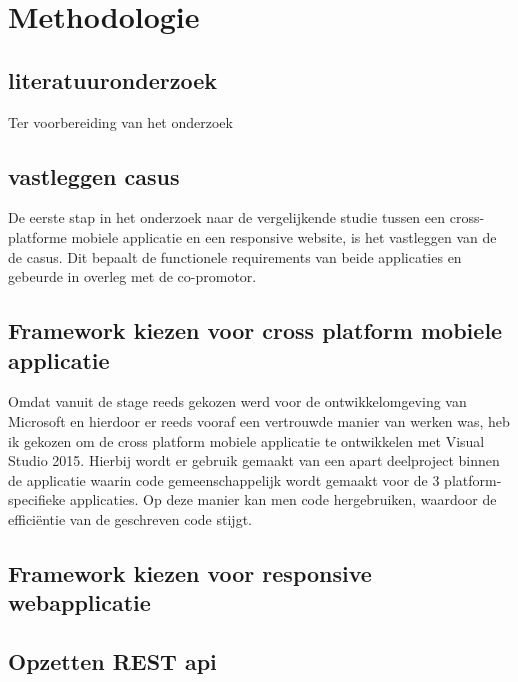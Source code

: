 
\chapter{Methodologie}
\label{ch:methodologie}


\section{literatuuronderzoek}
Ter voorbereiding van het onderzoek 

\section{vastleggen casus}
De eerste stap in het onderzoek naar de vergelijkende studie tussen een cross-platforme mobiele applicatie en een
responsive website, is het vastleggen van de de casus. Dit bepaalt de functionele requirements van beide applicaties en
gebeurde in overleg met de co-promotor.
\section{Framework kiezen voor cross platform mobiele applicatie}
Omdat vanuit de stage reeds gekozen werd voor de ontwikkelomgeving van Microsoft en hierdoor er reeds vooraf een vertrouwde
manier van werken was, heb ik gekozen om de cross platform mobiele applicatie te ontwikkelen met Visual Studio 2015.
Hierbij wordt er gebruik gemaakt van een apart deelproject binnen de applicatie waarin code gemeenschappelijk wordt gemaakt voor
de 3 platform-specifieke applicaties. Op deze manier kan men code hergebruiken, waardoor de efficiëntie van de geschreven code stijgt.


\section{Framework kiezen voor responsive webapplicatie}

\section{Opzetten REST api}


